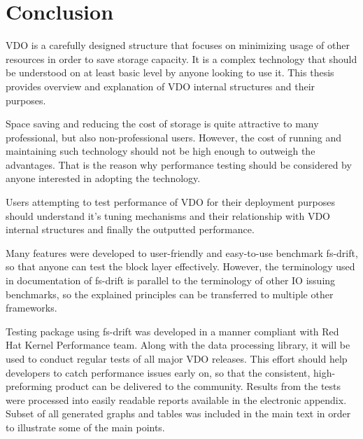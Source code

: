 \documentclass[
  color, %
  table, %
  lof,   %
  lot,   %
]{fithesis3}
\begin{document}



\chapter{Conclusion}
\label{conclusion}

VDO is a carefully designed structure that focuses on minimizing usage of other resources in order to save storage capacity. It is a complex technology that should be understood on at least basic level by anyone looking to use it. This thesis provides overview and explanation of VDO internal structures and their purposes.

Space saving and reducing the cost of storage is quite attractive to many professional, but also non-professional users. However, the cost of running and maintaining such technology should not be high enough to outweigh the advantages. That is the reason why performance testing should be considered by anyone interested in adopting the technology.

Users attempting to test performance of VDO for their deployment purposes should understand it's tuning mechanisms and their relationship with VDO internal structures and finally the outputted performance.

Many features were developed to user-friendly and easy-to-use benchmark fs-drift, so that anyone can test the block layer effectively. However, the terminology used in documentation of fs-drift is parallel to the terminology of other IO issuing benchmarks, so the explained principles can be transferred to multiple other frameworks.

Testing package using fs-drift was developed in a manner compliant with Red Hat Kernel Performance team. Along with the data processing library, it will be used to conduct regular tests of all major VDO releases. This effort should help developers to catch performance issues early on, so that the consistent, high-preforming product can be delivered to the community. Results from the tests were processed into easily readable reports available in the electronic appendix. Subset of all generated graphs and tables was included in the main text in order to illustrate some of the main points.
\end{document}
